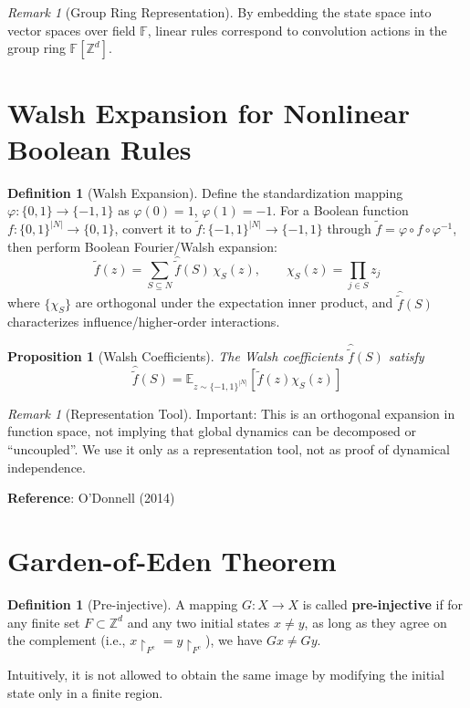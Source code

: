 \documentclass[11pt]{article}
\newtheorem{proposition}[theorem]{Proposition}
\theoremstyle{definition}
\newtheorem{definition}[theorem]{Definition}
\theoremstyle{remark}
\newtheorem{remark}[theorem]{Remark}
\begin{document}
\begin{remark}[Group Ring Representation]
By embedding the state space into vector spaces over field \( \mathbb{F} \), linear rules correspond to convolution actions in the group ring \( \mathbb{F}[\mathbb{Z}^d] \).
\end{remark}

\section{Walsh Expansion for Nonlinear Boolean Rules}\label{sec:walsh}

\begin{definition}[Walsh Expansion]\label{def:walsh}
Define the standardization mapping \( \varphi: \{0,1\} \to \{-1,1\} \) as \( \varphi(0) = 1 \), \( \varphi(1) = -1 \). For a Boolean function \( f: \{0,1\}^{|N|} \to \{0,1\} \), convert it to \( \tilde{f}: \{-1,1\}^{|N|} \to \{-1,1\} \) through \( \tilde{f} = \varphi \circ f \circ \varphi^{-1} \), then perform Boolean Fourier/Walsh expansion:
\[
\tilde{f}(z) = \sum_{S \subseteq N} \widehat{\tilde{f}}(S) \, \chi_S(z), \qquad \chi_S(z) = \prod_{j \in S} z_j
\]
where \( \{\chi_S\} \) are orthogonal under the expectation inner product, and \( \widehat{\tilde{f}}(S) \) characterizes influence/higher-order interactions.
\end{definition}

\begin{proposition}[Walsh Coefficients]\label{prop:walsh}
The Walsh coefficients \( \widehat{\tilde{f}}(S) \) satisfy
\[
\widehat{\tilde{f}}(S) = \mathbb{E}_{z \sim \{-1,1\}^{|N|}} [\tilde{f}(z) \chi_S(z)]
\]
\end{proposition}

\begin{remark}[Representation Tool]
Important: This is an orthogonal expansion in function space, not implying that global dynamics can be decomposed or ``uncoupled''. We use it only as a representation tool, not as proof of dynamical independence.

\textbf{Reference}: O'Donnell (2014)
\end{remark}

\section{Garden-of-Eden Theorem}\label{sec:garden}

\begin{definition}[Pre-injective]\label{def:preinj}
A mapping \( G: X \to X \) is called \textbf{pre-injective} if for any finite set \( F \subset \mathbb{Z}^d \) and any two initial states \( x \neq y \), as long as they agree on the complement (i.e., \( x \restriction_{F^{\mathrm{c}}} = y \restriction_{F^{\mathrm{c}}} \)), we have \( G x \neq G y \).

Intuitively, it is not allowed to obtain the same image by modifying the initial state only in a finite region.
\end{definition}
\end{document}
